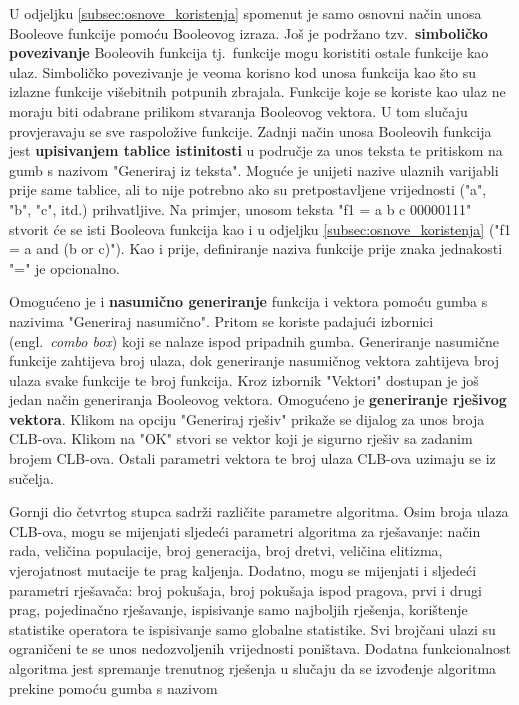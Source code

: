 \documentclass[times, utf8, diplomski]{fer}
\begin{document}
U odjeljku \ref{subsec:osnove_koristenja} spomenut je samo osnovni način unosa Booleove funkcije pomoću Booleovog izraza. Još je podržano tzv.~\textbf{simboličko povezivanje} Booleovih funkcija tj.~funkcije mogu koristiti ostale funkcije kao ulaz. Simboličko povezivanje je veoma korisno kod unosa funkcija kao što su izlazne funkcije višebitnih potpunih zbrajala. Funkcije koje se koriste kao ulaz ne moraju biti odabrane prilikom stvaranja Booleovog vektora. U tom slučaju provjeravaju se sve raspoložive funkcije. Zadnji način unosa Booleovih funkcija jest \textbf{upisivanjem tablice istinitosti} u područje za unos teksta te pritiskom na gumb s nazivom "Generiraj iz teksta". Moguće je unijeti nazive ulaznih varijabli prije same tablice, ali to nije potrebno ako su pretpostavljene vrijednosti ("a", "b", "c", itd.) prihvatljive. Na primjer, unosom teksta "f1 = a b c 00000111" stvorit će se isti Booleova funkcija kao i u odjeljku \ref{subsec:osnove_koristenja} ("f1 = a and (b or c)"). Kao i prije, definiranje naziva funkcije prije znaka jednakosti "=" je opcionalno.

Omogućeno je i \textbf{nasumično generiranje} funkcija i vektora pomoću gumba s nazivima "Generiraj nasumično". Pritom se koriste padajući izbornici (engl.~\textit{combo box}) koji se nalaze ispod pripadnih gumba. Generiranje nasumične funkcije zahtijeva broj ulaza, dok generiranje nasumičnog vektora zahtijeva broj ulaza svake funkcije te broj funkcija. Kroz izbornik "Vektori" dostupan je još jedan način generiranja Booleovog vektora. Omogućeno je \textbf{generiranje rješivog vektora}. Klikom na opciju "Generiraj rješiv" prikaže se dijalog za unos broja CLB-ova. Klikom na "OK" stvori se vektor koji je sigurno rješiv sa zadanim brojem CLB-ova. Ostali parametri vektora te broj ulaza CLB-ova uzimaju se iz sučelja.

Gornji dio četvrtog stupca sadrži različite parametre algoritma. Osim broja ulaza CLB-ova, mogu se mijenjati sljedeći parametri algoritma za rješavanje: način rada, veličina populacije, broj generacija, broj dretvi, veličina elitizma, vjerojatnost mutacije te  prag kaljenja. Dodatno, mogu se mijenjati i sljedeći parametri rješavača: broj pokušaja, broj pokušaja ispod pragova, prvi i drugi prag, pojedinačno rješavanje, ispisivanje samo najboljih rješenja, korištenje statistike operatora te ispisivanje samo globalne statistike. Svi brojčani ulazi su ograničeni te se unos nedozvoljenih vrijednosti poništava. Dodatna funkcionalnost algoritma jest spremanje trenutnog rješenja u slučaju da se izvođenje algoritma prekine pomoću gumba s nazivom %
\end{document}
